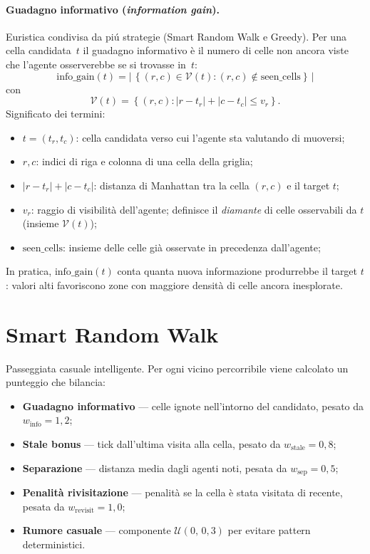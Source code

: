 \paragraph{Guadagno informativo (\textit{information gain}).}
Euristica condivisa da pi\'u strategie (Smart Random Walk e Greedy).
Per una cella candidata~$t$ il guadagno informativo \`e il numero di celle non ancora viste
che l'agente osserverebbe se si trovasse in~$t$:
$$\text{info\_gain}(t) = \left|\,\left\{(r,c) \in \mathcal{V}(t) : (r,c) \notin \text{seen\_cells}\right\}\,\right|$$
con
$$\mathcal{V}(t)=\left\{(r,c): |r-t_r|+|c-t_c|\le v_r\right\}.$$
Significato dei termini:
\begin{itemize}
  \item $t=(t_r,t_c)$: cella candidata verso cui l'agente sta valutando di muoversi;
  \item $r,c$: indici di riga e colonna di una cella della griglia;
  \item $|r-t_r|+|c-t_c|$: distanza di Manhattan tra la cella $(r,c)$ e il target $t$;
  \item $v_r$: raggio di visibilit\`a dell'agente; definisce il \emph{diamante} di celle
        osservabili da $t$ (insieme $\mathcal{V}(t)$);
  \item $\text{seen\_cells}$: insieme delle celle gi\`a osservate in precedenza
        dall'agente;
\end{itemize}
In pratica, $\text{info\_gain}(t)$ conta quanta nuova informazione produrrebbe il target
$t$: valori alti favoriscono zone con maggiore densit\`a di celle ancora inesplorate.

\section{Smart Random Walk}

Passeggiata casuale intelligente. Per ogni vicino percorribile viene calcolato un
punteggio che bilancia:

\begin{itemize}
  \item \textbf{Guadagno informativo} --- celle ignote nell'intorno del candidato,
        pesato da $w_{\text{info}} = 1{,}2$;
  \item \textbf{Stale bonus} --- tick dall'ultima visita alla cella, pesato da
        $w_{\text{stale}} = 0{,}8$;
  \item \textbf{Separazione} --- distanza media dagli agenti noti, pesata da
        $w_{\text{sep}} = 0{,}5$;
  \item \textbf{Penalit\`a rivisitazione} --- penalit\`a se la cella \`e stata visitata di recente,
        pesata da $w_{\text{revisit}} = 1{,}0$;
  \item \textbf{Rumore casuale} --- componente $\mathcal{U}(0,\, 0{,}3)$ per evitare pattern deterministici.
\end{itemize}

